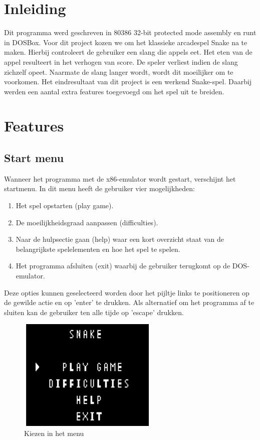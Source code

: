 \documentclass[11pt,a4paper]{article}
\begin{document}


\tableofcontents

\section{Inleiding}
Dit programma werd geschreven in 80386 32-bit protected mode assembly en runt in DOSBox.
Voor dit project kozen we om het klassieke arcadespel Snake na te maken. Hierbij controleert de gebruiker een slang die appels eet. Het eten van de appel resulteert in het verhogen van score. De speler verliest indien de slang zichzelf opeet. Naarmate de slang langer wordt, wordt dit moeilijker om te voorkomen.
Het eindresultaat van dit project is een werkend Snake-spel. Daarbij werden een aantal extra features toegevoegd om het spel uit te breiden.

\newpage

\section{Features}

\subsection{Start menu}

Wanneer het programma met de x86-emulator wordt gestart, verschijnt het startmenu. In dit menu heeft de gebruiker vier mogelijkheden: 
\begin{enumerate}
	\item Het spel opstarten (play game).
	\item De moeilijkheidsgraad aanpassen (difficulties).
	\item Naar de hulpsectie gaan (help) waar een kort overzicht staat van de belangrijkste spelelementen en hoe het spel te spelen.
	\item Het programma afsluiten (exit) waarbij de gebruiker terugkomt op de DOS-emulator.
\end{enumerate}
Deze opties kunnen geselecteerd worden door het pijltje links te positioneren op de gewilde actie en op 'enter' te drukken. Als alternatief om het programma af te sluiten kan de gebruiker ten alle tijde op 'escape' drukken.

\begin{figure}[h]
\centering
\includegraphics[scale=1]{main.png}
\caption{Kiezen in het menu}
\label{fig:menu}
\end{figure}
\end{document}
